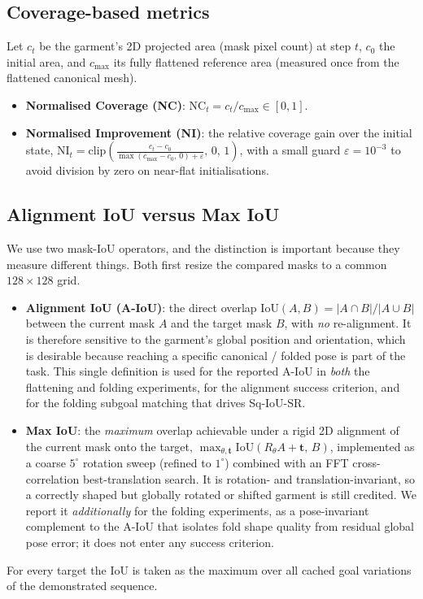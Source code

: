 \documentclass[journal]{IEEEtran}
\begin{document}
\subsection{Coverage-based metrics}
Let $c_t$ be the garment's 2D projected area (mask pixel count) at step $t$, $c_0$ the initial area,
and $c_{\text{max}}$ its fully flattened reference area (measured once from the flattened canonical
mesh).
\begin{itemize}
    \item \textbf{Normalised Coverage (NC)}: $\mathrm{NC}_t = c_t / c_{\text{max}} \in [0,1]$.
    \item \textbf{Normalised Improvement (NI)}: the relative coverage gain over the initial state,
    $\mathrm{NI}_t = \mathrm{clip}\!\left(\frac{c_t - c_0}{\max(c_{\text{max}} - c_0,\,0) + \varepsilon},\, 0,\, 1\right)$,
    with a small guard $\varepsilon = 10^{-3}$ to avoid division by zero on near-flat initialisations.
\end{itemize}

\subsection{Alignment IoU versus Max IoU}
\label{app:iou_variants}
We use two mask-IoU operators, and the distinction is important because they measure different things.
Both first resize the compared masks to a common $128{\times}128$ grid.
\begin{itemize}
    \item \textbf{Alignment IoU (A-IoU)}: the direct overlap $\mathrm{IoU}(A,B)=|A\cap B|/|A\cup B|$
    between the current mask $A$ and the target mask $B$, with \emph{no} re-alignment. It is therefore
    sensitive to the garment's global position and orientation, which is desirable because reaching a
    specific canonical / folded pose is part of the task. This single definition is used for the
    reported A-IoU in \emph{both} the flattening and folding experiments, for the alignment success
    criterion, and for the folding subgoal matching that drives Sq-IoU-SR.
    \item \textbf{Max IoU}: the \emph{maximum} overlap achievable under a rigid 2D alignment of the
    current mask onto the target, $\max_{\theta,\mathbf{t}} \mathrm{IoU}(R_{\theta}A + \mathbf{t},\,B)$,
    implemented as a coarse $5^{\circ}$ rotation sweep (refined to $1^{\circ}$) combined with an FFT
    cross-correlation best-translation search. It is rotation- and translation-invariant, so a
    correctly shaped but globally rotated or shifted garment is still credited. We report it
    \emph{additionally} for the folding experiments, as a pose-invariant complement to the A-IoU that
    isolates fold shape quality from residual global pose error; it does not enter any success
    criterion.
\end{itemize}
For every target the IoU is taken as the maximum over all cached goal variations of the demonstrated
sequence.
\end{document}
